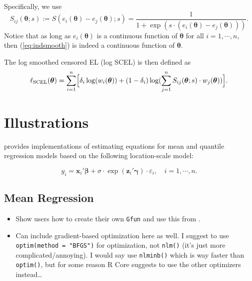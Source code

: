 \documentclass[article]{jss}
\renewcommand{\|}{\,|\,}
\begin{document}
Specifically, we use
\begin{equation}\label{eq:indsmooth}
  S_{ij}(\bm \theta;s) := S(e_i(\bm \theta)-e_j(\bm \theta);s)
  = \frac{1}{1+\exp(s\cdot(e_i(\bm \theta)-e_j(\bm \theta)))}.
\end{equation}
Notice that as long as \(e_i(\bm \theta)\) is a continuous function of \(\bm \theta\) for all \(i=1,\cdots,n\), then (\ref{eq:indsmooth}) is indeed a continuous function of \(\bm \theta\).

The log smoothed censored EL (log SCEL) is then defined as
\begin{equation}\label{eq:logel_smoo}
  \ell_{\textrm{SCEL}}(\bm \theta) = \sum_{i=1}^n \Bigl[\delta_i\log(w_i(\bm \theta)) +
    (1-\delta_i)\log(\sum_{j=1}^n S_{ij}(\bm \theta;s)\cdot w_j(\bm \theta))\Bigr].
\end{equation}

\hypertarget{illustrations}{%
\section{Illustrations}\label{illustrations}}

 provides implementations of estimating equations for mean and quantile regression models based on the following location-scale model:

\begin{equation} \label{md:lsmod}
  y_i = \bm x_i'\bm \beta+ \sigma\cdot\exp(\bm z_i'\bm \gamma)\cdot\varepsilon_i, \quad i=1,\cdots,n.
\end{equation}

\hypertarget{mean-regression}{%
\subsection{Mean Regression}\label{mean-regression}}

\begin{itemize}
\item
  Show users how to create their own \texttt{Gfun} and use this from .
\item
  Can include gradient-based optimization here as well. I suggest to use \texttt{optim(method\ =\ "BFGS")} for optimization, not \texttt{nlm()} (it's just more complicated/annoying). I would say use \texttt{nlminb()} which is way faster than \texttt{optim()}, but for some reason R Core suggests to use the other optimizers instead\ldots{}
\end{itemize}
\end{document}
